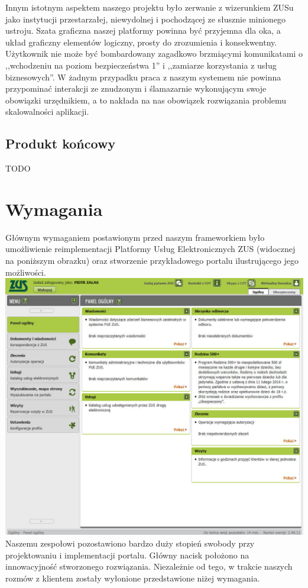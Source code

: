 \documentclass[licencjacka]{pracamgr}
\begin{document}
Innym istotnym aspektem naszego projektu było zerwanie z wizerunkiem ZUSu jako
instytucji przestarzałej, niewydolnej i pochodzącej ze słusznie minionego
ustroju. Szata graficzna naszej platformy powinna być przyjemna dla oka, a układ
graficzny elementów logiczny, prosty do zrozumienia i konsekwentny. Użytkownik
nie może być bombardowany zagadkowo brzmiącymi komunikatami o ,,wchodzeniu na
poziom bezpieczeństwa 1'' i ,,zamiarze korzystania z usług biznesowych''. W
żadnym przypadku praca z naszym systemem nie powinna przypominać interakcji
ze znudzonym i ślamazarnie wykonującym swoje obowiązki urzędnikiem, a to
nakłada na nas obowiązek rozwiązania problemu skalowalności aplikacji.

\section{Produkt końcowy}
TODO %

\chapter{Wymagania}

Głównym wymaganiem postawionym przed naszym frameworkiem było umożliwienie reimplementacji
Platformy Usług Elektronicznych ZUS (widocznej na poniższym obrazku) oraz stworzenie
przykładowego portalu ilustrującego jego możliwości.\\
\includegraphics[width=\textwidth]{obrazki/pue2.jpg}
Naszemu zespołowi pozostawiono bardzo duży stopień swobody przy projektowaniu i
implementacji portalu. Główny nacisk położono na innowacyjność stworzonego rozwiązania.
Niezależnie od tego, w trakcie naszych rozmów z klientem zostały wyłonione przedstawione
niżej wymagania.
\end{document}
